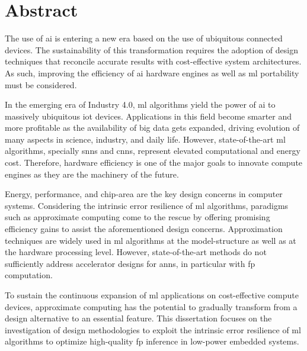 \chapter*{Abstract}
\thispagestyle{empty}
The use of \gls{ai} is entering a new era based on the use of ubiquitous connected devices. The sustainability of this transformation requires the adoption of design techniques that reconcile accurate results with cost-effective system architectures. As such, improving the efficiency of \gls{ai} hardware engines as well as \gls{ml} portability must be considered.

In the emerging era of Industry 4.0, \gls{ml} algorithms yield the power of \gls{ai} to massively ubiquitous \gls{iot} devices. Applications in this field become smarter and more profitable as the availability of big data gets expanded, driving evolution of many aspects in science, industry, and daily life. However, state-of-the-art \gls{ml} algorithms, specially \glspl{snn} and \glspl{cnn}, represent elevated computational and energy cost. Therefore, hardware efficiency is one of the major goals to innovate compute engines as they are the machinery of the future.

Energy, performance, and chip-area are the key design concerns in computer systems. Considering the intrinsic error resilience of \gls{ml} algorithms, paradigms such as approximate computing come to the rescue by offering promising efficiency gains to assist the aforementioned design concerns. Approximation techniques are widely used in \gls{ml} algorithms at the model-structure as well as at the hardware processing level. However, state-of-the-art methods do not sufficiently address accelerator designs for \glspl{ann}, in particular with \gls{fp} computation.

To sustain the continuous expansion of \gls{ml} applications on cost-effective compute devices, approximate computing has the potential to gradually transform from a design alternative to an essential feature. This dissertation focuses on the investigation of design methodologies to exploit the intrinsic error resilience of \gls{ml} algorithms to optimize high-quality \gls{fp} inference in low-power embedded systems.

